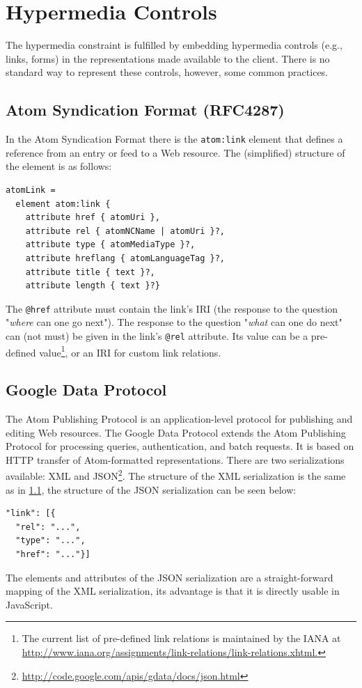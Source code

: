 \documentclass{acm_proc_article-sp}
\begin{document}
\section{Hypermedia Controls}\label{sec:currenthateoas}
The hypermedia constraint is fulfilled by embedding hypermedia controls (e.g., links, forms) in the representations made available to the client. There is no standard way to represent these controls, however, some common practices.

\subsection{Atom Syndication Format (RFC4287)}\label{sec:atom}
In the Atom Syndication Format \cite{Atom:Synd} there is the \texttt{atom:link} element that defines a reference from an entry or feed to a Web resource. The (simplified) structure of the element is as follows:
\begin{verbatim}
atomLink =
  element atom:link {
    attribute href { atomUri },
    attribute rel { atomNCName | atomUri }?,
    attribute type { atomMediaType }?,
    attribute hreflang { atomLanguageTag }?,
    attribute title { text }?,
    attribute length { text }?}
\end{verbatim}
The \texttt{@href} attribute must contain the link's IRI (the response to the question "\textit{where} can one go next"). The response to the question "\textit{what} can one do next" can (not must) be given in the link's \texttt{@rel} attribute. Its value can be a pre-defined value\footnote{The current list of pre-defined link relations is maintained by the IANA at \url{http://www.iana.org/assignments/link-relations/link-relations.xhtml.}}, or an IRI for custom link relations.

\subsection{Google Data Protocol}\label{sec:gdata}
The Atom Publishing Protocol\cite{Atom:Pub} is an application-level protocol for publishing and editing Web resources. The Google Data Protocol\cite{Google:Data} extends the Atom Publishing Protocol for processing queries, authentication, and batch requests. It is based on HTTP transfer of Atom-formatted representations. There are two serializations available: XML and JSON\footnote{\url{http://code.google.com/apis/gdata/docs/json.html}}. The structure of the XML serialization is the same as in \ref{sec:atom}, the structure of the JSON serialization can be seen below:
\begin{verbatim}
"link": [{
  "rel": "...",
  "type": "...",
  "href": "..."}]
\end{verbatim}
The elements and attributes of the JSON serialization are a straight-forward mapping of the XML serialization, its advantage is that it is directly usable in JavaScript.
\end{document}
